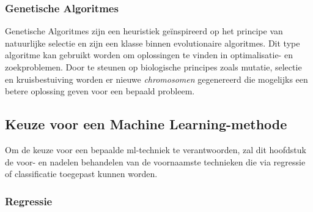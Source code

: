 	\subsubsection{Genetische Algoritmes}
	Genetische Algoritmes zijn een heuristiek ge\"inspireerd op het principe van natuurlijke selectie en zijn een klasse binnen evolutionaire algoritmes. Dit type algoritme kan gebruikt worden om oplossingen te vinden in optimalisatie- en zoekproblemen. Door te steunen op biologische principes zoals mutatie, selectie en kruisbestuiving worden er nieuwe \textit{chromosomen} gegenereerd die mogelijks een betere oplossing geven voor een bepaald probleem.
	
\subsection{Keuze voor een Machine Learning-methode }	

Om de keuze voor een bepaalde \gls{ml}-techniek te verantwoorden, zal dit hoofdstuk de voor- en nadelen behandelen van de voornaamste technieken die via regressie of classificatie toegepast kunnen worden\cite{bron:mlalgoritmes}.

	\subsubsection{Regressie}

